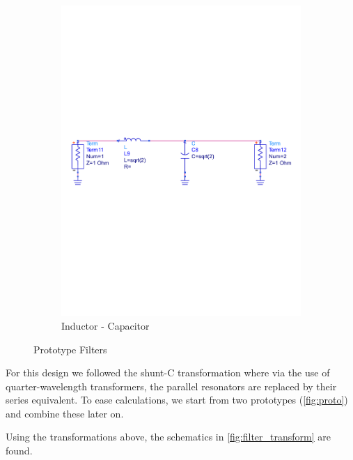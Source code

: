 \documentclass[a4paper]{article}        %
\begin{document}
\begin{figure}[H]
\begin{subfigure}{0.5\textwidth}
      \includegraphics[width=\textwidth]{fig/Filter/2nd_order/proto_2.pdf}
      \caption{Inductor - Capacitor}
      \label{fig:proto_incap}
    \end{subfigure}
    \caption{Prototype Filters}
    \label{fig:proto}
  \end{figure}

  For this design we followed the shunt-C transformation where via the use of quarter-wavelength transformers, the parallel resonators are replaced by their series equivalent. To ease calculations, we start from two prototypes (\autoref{fig:proto}) and combine these later on.

  Using the transformations above, the schematics in \autoref{fig:filter_transform} are found.
\end{document}
